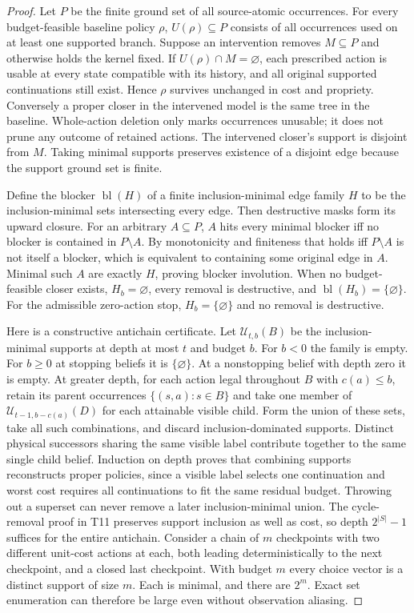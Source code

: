 \begin{proof}

Let \(P\) be the finite ground set of all source-atomic occurrences. For every budget-feasible baseline policy \(\rho\), \(U(\rho)\subseteq P\) consists of all occurrences used on at least one supported branch. Suppose an intervention removes \(M\subseteq P\) and otherwise holds the kernel fixed. If \(U(\rho)\cap M=\varnothing\), each prescribed action is usable at every state compatible with its history, and all original supported continuations still exist. Hence \(\rho\) survives unchanged in cost and propriety. Conversely a proper closer in the intervened model is the same tree in the baseline. Whole-action deletion only marks occurrences unusable; it does not prune any outcome of retained actions. The intervened closer's support is disjoint from \(M\). Taking minimal supports preserves existence of a disjoint edge because the support ground set is finite.

Define the blocker \(\operatorname{bl}(H)\) of a finite inclusion-minimal edge family \(H\) to be the inclusion-minimal sets intersecting every edge. Then destructive masks form its upward closure. For an arbitrary \(A\subseteq P\), \(A\) hits every minimal blocker iff no blocker is contained in \(P\setminus A\). By monotonicity and finiteness that holds iff \(P\setminus A\) is not itself a blocker, which is equivalent to containing some original edge in \(A\). Minimal such \(A\) are exactly \(H\), proving blocker involution. When no budget-feasible closer exists, \(H_b=\varnothing\), every removal is destructive, and \(\operatorname{bl}(H_b)=\{\varnothing\}\). For the admissible zero-action stop, \(H_b=\{\varnothing\}\) and no removal is destructive.

Here is a constructive antichain certificate. Let \(\mathcal U_{t,b}(B)\) be the inclusion-minimal supports at depth at most \(t\) and budget \(b\). For \(b<0\) the family is empty. For \(b\ge0\) at stopping beliefs it is \(\{\varnothing\}\). At a nonstopping belief with depth zero it is empty. At greater depth, for each action legal throughout \(B\) with \(c(a)\le b\), retain its parent occurrences \(\{(s,a):s\in B\}\) and take one member of \(\mathcal U_{t-1,b-c(a)}(D)\) for each attainable visible child. Form the union of these sets, take all such combinations, and discard inclusion-dominated supports. Distinct physical successors sharing the same visible label contribute together to the same single child belief. Induction on depth proves that combining supports reconstructs proper policies, since a visible label selects one continuation and worst cost requires all continuations to fit the same residual budget. Throwing out a superset can never remove a later inclusion-minimal union. The cycle-removal proof in T11 preserves support inclusion as well as cost, so depth \(2^{|S|}-1\) suffices for the entire antichain. Consider a chain of \(m\) checkpoints with two different unit-cost actions at each, both leading deterministically to the next checkpoint, and a closed last checkpoint. With budget \(m\) every choice vector is a distinct support of size \(m\). Each is minimal, and there are \(2^m\). Exact set enumeration can therefore be large even without observation aliasing.


\end{proof}
